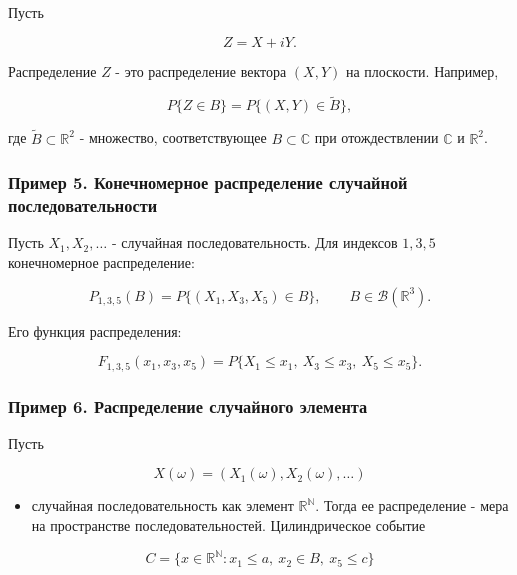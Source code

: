 \documentclass[
  11pt,
  a4paper,
]{article}
\providecommand{\tightlist}{%
  \setlength{\itemsep}{0pt}\setlength{\parskip}{0pt}}
\begin{document}
Пусть

\[
Z=X+iY.
\]

Распределение \(Z\) - это распределение вектора \((X,Y)\) на плоскости.
Например,

\[
P\{Z\in B\}=P\{(X,Y)\in \widetilde B\},
\]

где \(\widetilde B\subset\mathbb R^2\) - множество, соответствующее
\(B\subset\mathbb C\) при отождествлении \(\mathbb C\) и
\(\mathbb R^2\).

\subsubsection{Пример 5. Конечномерное распределение случайной
последовательности}\label{ux43fux440ux438ux43cux435ux440-5.-ux43aux43eux43dux435ux447ux43dux43eux43cux435ux440ux43dux43eux435-ux440ux430ux441ux43fux440ux435ux434ux435ux43bux435ux43dux438ux435-ux441ux43bux443ux447ux430ux439ux43dux43eux439-ux43fux43eux441ux43bux435ux434ux43eux432ux430ux442ux435ux43bux44cux43dux43eux441ux442ux438}

Пусть \(X_1,X_2,\ldots\) - случайная последовательность. Для индексов
\(1,3,5\) конечномерное распределение:

\[
P_{1,3,5}(B)=P\{(X_1,X_3,X_5)\in B\},
\qquad B\in\mathcal B(\mathbb R^3).
\]

Его функция распределения:

\[
F_{1,3,5}(x_1,x_3,x_5)
=
P\{X_1\le x_1,\ X_3\le x_3,\ X_5\le x_5\}.
\]

\subsubsection{Пример 6. Распределение случайного
элемента}\label{ux43fux440ux438ux43cux435ux440-6.-ux440ux430ux441ux43fux440ux435ux434ux435ux43bux435ux43dux438ux435-ux441ux43bux443ux447ux430ux439ux43dux43eux433ux43e-ux44dux43bux435ux43cux435ux43dux442ux430}

Пусть

\[
X(\omega)=(X_1(\omega),X_2(\omega),\ldots)
\]

\begin{itemize}
\tightlist
\item
  случайная последовательность как элемент \(\mathbb R^{\mathbb N}\).
  Тогда ее распределение - мера на пространстве последовательностей.
  Цилиндрическое событие
\end{itemize}

\[
C=\{x\in\mathbb R^{\mathbb N}:x_1\le a,\ x_2\in B,\ x_5\le c\}
\]
\end{document}
